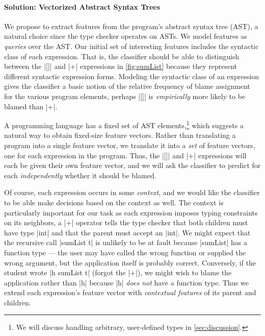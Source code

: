 \paragraph{\textbf{Solution: Vectorized Abstract Syntax Trees}}
We propose to extract features from the program's
abstract syntax tree (AST), a natural choice since the type checker
operates on ASTs.
%
We model features as \emph{queries} over the AST.\@
%
Our initial set of interesting features includes the syntactic class of
each expression.
%
That is, the classifier should be able to distinguish between the |[]|
and |+| expressions in \autoref{fig:sumList} because they represent
different syntactic expression forms.
%
Modeling the syntactic class of an expression gives the classifier a
basic notion of the relative frequency of blame assignment for the
various program elements, \ie perhaps |[]| is \emph{empirically} more
likely to be blamed than |+|.

A programming language has a fixed set of AST elements,\footnote{We will
  discuss handling arbitrary, user-defined types in
  \autoref{sec:discussion}.} which suggests a natural way to obtain
fixed-size feature vectors. Rather than translating a program into a
single feature vector, we translate it into a \emph{set} of feature
vectors, one for each expression in the program.
%
Thus, the |[]| and |+| expressions will each be given their own feature
vector, and we will ask the classifier to predict for each
\emph{independently} whether it should be blamed.

Of course, each expression occurs in some \emph{context}, and we would
like the classifier to be able make decisions based on the context as
well.
%
The context is particularly important for our task as each expression
imposes typing constraints on its neighbors, \eg a |+| operator tells
the type checker that both children must have type |int| and that
the parent must accept an |int|.
%
We might expect that the recursive call |sumList t| is
unlikely to be at fault because |sumList| has a function type --- the
user may have called the wrong function or supplied the wrong argument,
but the application itself is probably correct.
%
Conversely, if the student wrote |h sumList t| (\ie forgot the |+|), we
might wish to blame the application rather than |h| because |h|
\emph{does not} have a function type.
%
Thus we extend each expression's feature vector with
\emph{contextual features} of its parent and children.

